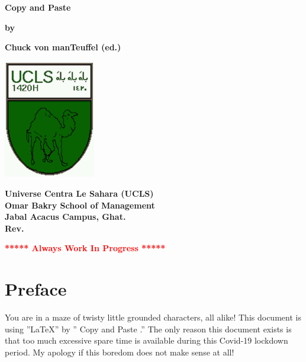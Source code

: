 \documentclass[12pt]{book}
\newcommand{\pengarangs}{%
    Chuck von manTeuffel (ed.)
}
\newcommand{\judul}{%
Copy and Paste
}
\begin{document}
\begin{titlepage}
    \begin{center}    

    \vspace*{15mm}
    \textbf{\Large \judul}

    \vspace*{30mm}       
    \textbf{by}

    \vspace*{15mm}    
    \textbf{\Large \pengarangs}

    \vspace*{4.0cm}

    \begin{center}
        \includegraphics[width=40mm]{ucls-coat}
    \end{center}

    \textbf{
       Universe Centra Le Sahara (UCLS)\\[10pt]
       Omar Bakry School of Management\\[10pt]
       Jabal Acacus Campus, Ghat. \\[10pt]
       Rev. \rev%
    }

    \vspace*{15mm}    
    \textbf{\LARGE \textcolor{red}{***** Always Work In Progress *****}}

    \end{center}

\end{titlepage}


\tableofcontents

\newpage

\chapter*{Preface}

You are in a maze of twisty little grounded characters, all alike!
This document is using ''\LaTeX'' by ''\judul.''
The only reason this document exists is that too much excessive spare time 
is available during this Covid-19 lockdown period.
My apology if this boredom does not make sense at all!
\end{document}

